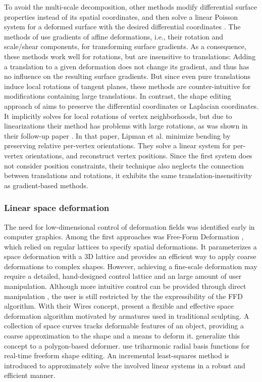 To avoid the multi-scale decomposition, other methods modify differential surface properties instead of its spatial coordinates, and then solve a linear Poisson system for a deformed surface with the desired differential coordinates \citep{lipman2004differential,sorkine2004laplacian,yu2004mesh,zayer2005harmonic,lipman2005linear}. The methods of \cite{yu2004mesh,zayer2005harmonic} use gradients of affine deformations, i.e., their rotation and scale/shear components, for transforming surface gradients.  As a consequence, these methods work well for rotations, but are insensitive to translations: Adding a translation to a given deformation does not change its gradient, and thus has no influence on the resulting surface gradients. But since even pure translations induce local rotations of tangent planes, these methods are counter-intuitive for modifications containing large translations. In contrast, the shape editing approach of \cite{sorkine2004laplacian} aims to preserve the differential coordinates or Laplacian coordinates. It implicitly solves for local rotations of vertex neighborhoods, but due to linearizations their method has problems with large rotations, as was shown in their follow-up paper \citep{lipman2005linear}. In that paper, Lipman et al. minimize bending by preserving relative per-vertex orientations. They solve a linear system for per-vertex orientations, and reconstruct vertex positions. Since the first system does not consider position constraints, their technique also neglects the connection between translations and rotations, it exhibits the same translation-insensitivity as gradient-based methods.

\subsubsection{Linear space deformation}
The need for low-dimensional control of deformation fields was identified early in computer graphics. Among the first approaches was Free-Form Deformation \citep{sederberg1986free}, which relied on regular lattices to specify spatial deformations. It parameterizes a space deformation with a 3D lattice and provides an efficient way to apply coarse deformations to complex shapes. However, achieving a fine-scale deformation may require a detailed, hand-designed control lattice \citep{coquillart1990extended,maccracken1996free} and an large amount of user manipulation. Although more intuitive control can be provided through direct manipulation \citep{hsu1992direct}, the user is still restricted by the the expressibility of the FFD algorithm. With their Wires concept, \cite{singh1998wires} present a flexible and effective space deformation algorithm motivated by armatures used in traditional sculpting. A collection of space curves tracks deformable features of an object, providing a coarse approximation to the shape and a means to deform it. \cite{singh2000skinning} generalize this concept to a polygon-based deformer. \cite{botsch2005real} use triharmonic radial basis functions for real-time freeform shape editing. An incremental least-squares method is introduced to approximately solve the involved linear systems in a robust and efficient manner.

